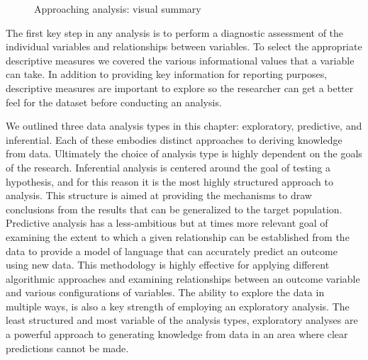 \documentclass[
  letterpaper,
]{latex/krantz}
\theoremstyle{definition}
\theoremstyle{remark}
\begin{document}
\begin{figure}[H]


\caption{\label{fig-approaching-analysis-vis-sum}Approaching analysis:
visual summary}

\end{figure}%

The first key step in any analysis is to perform a diagnostic assessment
of the individual variables and relationships between variables. To
select the appropriate descriptive measures we covered the various
informational values that a variable can take. In addition to providing
key information for reporting purposes, descriptive measures are
important to explore so the researcher can get a better feel for the
dataset before conducting an analysis.

We outlined three data analysis types in this chapter: exploratory,
predictive, and inferential. Each of these embodies distinct approaches
to deriving knowledge from data. Ultimately the choice of analysis type
is highly dependent on the goals of the research. Inferential analysis
is centered around the goal of testing a hypothesis, and for this reason
it is the most highly structured approach to analysis. This structure is
aimed at providing the mechanisms to draw conclusions from the results
that can be generalized to the target population. Predictive analysis
has a less-ambitious but at times more relevant goal of examining the
extent to which a given relationship can be established from the data to
provide a model of language that can accurately predict an outcome using
new data. This methodology is highly effective for applying different
algorithmic approaches and examining relationships between an outcome
variable and various configurations of variables. The ability to explore
the data in multiple ways, is also a key strength of employing an
exploratory analysis. The least structured and most variable of the
analysis types, exploratory analyses are a powerful approach to
generating knowledge from data in an area where clear predictions cannot
be made.
\end{document}

